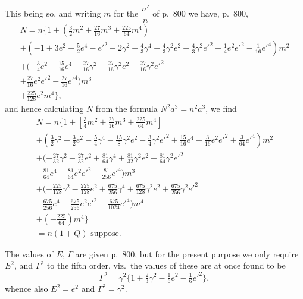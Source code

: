 \documentclass[11pt,a4paper]{article}
\theoremstyle{plain}
\theoremstyle{definition}
\theoremstyle{remark}
\begin{document}
This being so, and writing $m$ for the $\dfrac{n'}{n}$ of p.~800 we have, p.~800,
\begin{multline*}
N = n\{1 + (\tfrac32 m^{2} + \tfrac{27}{16}m^{3} + \tfrac{225}{64}m^{4})\\
+ (-1 + 3e^{2} - \tfrac52 e^{4} - e'^{2} - 2\gamma^{2} + \tfrac43 \gamma^{4} + \tfrac43 \gamma^{2}e^{2} - \tfrac43 \gamma^{2}e'^{2} - \tfrac14 e^{2}e'^{2} - \tfrac{1}{16}e'^{4})m^{2}\\
+ (-\tfrac34 e^{2} - \tfrac{15}{16}e^{4} + \tfrac{27}{16}\gamma^{2} + \tfrac{27}{16}\gamma^{2}e^{2} - \tfrac{27}{16}\gamma^{2}e'^{2}\\
+ \tfrac{27}{16}e^{2}e'^{2} - \tfrac{27}{16}e'^{4})m^{3}\\
+ \tfrac{225}{128}e^{2}m^{4}\},
\end{multline*}
and hence calculating $N$ from the formula $N^{2}a^{3}=n^{2}a^{3}$, we find
\begin{multline*}
N=n\{1 + [\tfrac34 m^{2} + \tfrac{27}{16}m^{3} + \tfrac{225}{64}m^{4}]\\
+(\tfrac32 \gamma^{2} + \tfrac32 e^{2} - \tfrac54 \gamma^{4} - \tfrac{15}{8}\gamma^{2}e^{2} - \tfrac34 \gamma^{2}e'^{2} + \tfrac{15}{16}e^{4} + \tfrac{3}{16}e^{2}e'^{2} + \tfrac{3}{64}e'^{4})m^{2}\\
+(-\tfrac{27}{32}\gamma^{2} - \tfrac{27}{32}e^{2} + \tfrac{81}{64}\gamma^{4} + \tfrac{81}{32}\gamma^{2}e^{2} + \tfrac{81}{64}\gamma^{2}e'^{2}\\
- \tfrac{81}{64}e^{4} - \tfrac{81}{64}e^{2}e'^{2} - \tfrac{81}{256}e'^{4})m^{3}\\
+(-\tfrac{225}{128}\gamma^{2} - \tfrac{225}{128}e^{2} + \tfrac{675}{256}\gamma^{4} + \tfrac{675}{128}\gamma^{2}e^{2} + \tfrac{675}{256}\gamma^{2}e'^{2}\\
- \tfrac{675}{256}e^{4} - \tfrac{675}{256}e^{2}e'^{2} - \tfrac{675}{1024}e'^{4})m^{4}\\
+(-\tfrac{225}{64})m^{4}\}\\
=n(1+Q) \text{ suppose.}
\end{multline*}

The values of $E$, $\Gamma$ are given p.~800, but for the present purpose we only require $E^{2}$, and $\Gamma^{2}$ to the fifth order, viz.\ the values of these are at once found to be
\[
\Gamma^{2}=\gamma^{2}\{1+\tfrac{2}{3}\gamma^{2}-\tfrac{1}{6}e^{2}-\tfrac{1}{6}e'^{2}\},
\]
whence also $E^{2}=e^{2}$ and $\Gamma^{2}=\gamma^{2}$.
\end{document}

